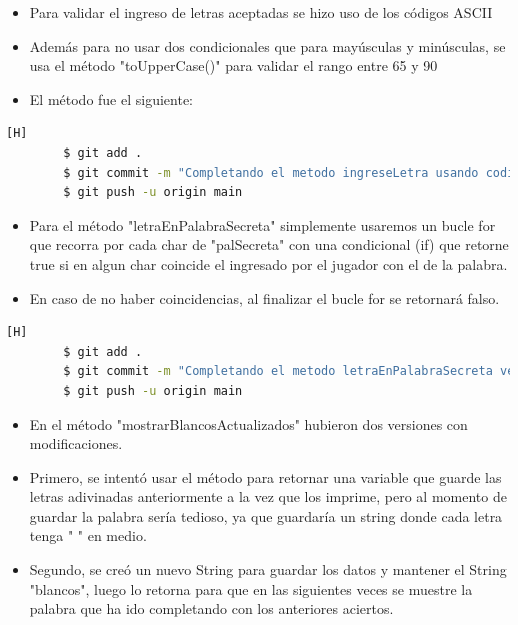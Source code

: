 \documentclass{article}
\begin{document}
    \begin{itemize}	
        \item Para validar el ingreso de letras aceptadas se hizo uso de los códigos ASCII 
        \item Además para no usar dos condicionales que para mayúsculas y minúsculas, se usa el método "toUpperCase()" para validar el rango entre 65 y 90 
	\item El método fue el siguiente:
    \end{itemize}
    

    \begin{lstlisting}[language=bash,caption={Commit: Completando el metodo ingreseLetra usando codigo ascii para validar las letras}][H]
		$ git add .
		$ git commit -m "Completando el metodo ingreseLetra usando codigo ascii para validar las letras"			
		$ git push -u origin main
    \end{lstlisting}
    
    
    \begin{itemize}	
        \item Para el método "letraEnPalabraSecreta" simplemente usaremos un bucle for que recorra por cada char de "palSecreta" con una condicional (if) que retorne true si en algun char coincide el ingresado por el jugador con el de la palabra.
        \item En caso de no haber coincidencias, al finalizar el bucle for se retornará falso.
    \end{itemize}

    

    \begin{lstlisting}[language=bash,caption={Commit: Completando el metodo letraEnPalabraSecreta verificando char por char si hay una coincidencia}][H]
		$ git add .
		$ git commit -m "Completando el metodo letraEnPalabraSecreta verificando char por char si hay una coincidencia"			
		$ git push -u origin main
    \end{lstlisting}
    
    \begin{itemize}	
        \item En el método "mostrarBlancosActualizados" hubieron dos versiones con modificaciones.
        \item Primero, se intentó usar el método para retornar una variable que guarde las letras adivinadas anteriormente a la vez que los imprime, pero al momento de guardar la palabra sería tedioso, ya que guardaría un string donde cada letra tenga " " en medio. 
        \item Segundo, se creó un nuevo String para guardar los datos y mantener el String "blancos", luego lo retorna para que en las siguientes veces se muestre la palabra que ha ido completando con los anteriores aciertos.
    \end{itemize}
\end{document}
